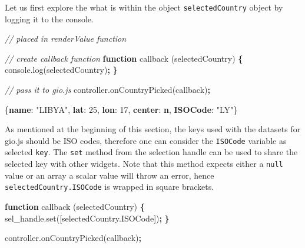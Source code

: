 \documentclass[
]{krantz}
\makeatletter
\newenvironment{Shaded}{\begin{snugshade}}{\end{snugshade}}
\newcommand{\AttributeTok}[1]{\textcolor[rgb]{0.61,0.61,0.61}{#1}}
\newcommand{\CommentTok}[1]{\textcolor[rgb]{0.37,0.37,0.37}{\textit{#1}}}
\newcommand{\DecValTok}[1]{\textcolor[rgb]{0.06,0.06,0.06}{#1}}
\newcommand{\ErrorTok}[1]{\textcolor[rgb]{0.14,0.14,0.14}{\textbf{#1}}}
\newcommand{\FunctionTok}[1]{\textcolor[rgb]{0,0,0}{#1}}
\newcommand{\KeywordTok}[1]{\textcolor[rgb]{0.27,0.27,0.27}{\textbf{#1}}}
\newcommand{\NormalTok}[1]{#1}
\newcommand{\OperatorTok}[1]{\textcolor[rgb]{0.43,0.43,0.43}{\textbf{#1}}}
\newcommand{\StringTok}[1]{\textcolor[rgb]{0.5,0.5,0.5}{#1}}
\newcommand{\VariableTok}[1]{\textcolor[rgb]{0,0,0}{#1}}
\newenvironment{kframe}{%
\medskip{}
\setlength{\fboxsep}{.8em}
 \def\at@end@of@kframe{}%
 \ifinner\ifhmode%
  \def\at@end@of@kframe{\end{minipage}}%
  \begin{minipage}{\columnwidth}%
 \fi\fi%
 \def\FrameCommand##1{\hskip\@totalleftmargin \hskip-\fboxsep
 \colorbox{shadecolor}{##1}\hskip-\fboxsep
     \hskip-\linewidth \hskip-\@totalleftmargin \hskip\columnwidth}%
 \MakeFramed {\advance\hsize-\width
   \@totalleftmargin\z@ \linewidth\hsize
   \@setminipage}}%
 {\par\unskip\endMakeFramed%
 \at@end@of@kframe}
\renewenvironment{Shaded}{\begin{kframe}}{\end{kframe}}
\makeatother
\begin{document}
Let us first explore the what is within the object \texttt{selectedCountry} object by logging it to the console.

\begin{Shaded}
\begin{Highlighting}[]
\CommentTok{// placed in renderValue function}

\CommentTok{// create callback function}
\KeywordTok{function} \AttributeTok{callback}\NormalTok{ (selectedCountry) }\OperatorTok{\{}
  \VariableTok{console}\NormalTok{.}\AttributeTok{log}\NormalTok{(selectedCountry)}\OperatorTok{;}
\OperatorTok{\}}

\CommentTok{// pass it to gio.js}
\VariableTok{controller}\NormalTok{.}\AttributeTok{onCountryPicked}\NormalTok{(callback)}\OperatorTok{;}
\end{Highlighting}
\end{Shaded}

\begin{Shaded}
\begin{Highlighting}[]
\FunctionTok{\{}\ErrorTok{name}\FunctionTok{:} \StringTok{"LIBYA"}\FunctionTok{,} \ErrorTok{lat}\FunctionTok{:} \DecValTok{25}\FunctionTok{,} \ErrorTok{lon}\FunctionTok{:} \DecValTok{17}\FunctionTok{,} \ErrorTok{center}\FunctionTok{:} \ErrorTok{n}\FunctionTok{,} \ErrorTok{ISOCode}\FunctionTok{:} \StringTok{"LY"}\FunctionTok{\}}
\end{Highlighting}
\end{Shaded}

As mentioned at the beginning of this section, the keys used with the datasets for gio.js should be ISO codes, therefore one can consider the \texttt{ISOCode} variable as selected \texttt{key}. The \texttt{set} method from the selection handle can be used to share the selected key with other widgets. Note that this method expects either a \texttt{null} value or an array a scalar value will throw an error, hence \texttt{selectedCountry.ISOCode} is wrapped in square brackets.

\begin{Shaded}
\begin{Highlighting}[]
\KeywordTok{function} \AttributeTok{callback}\NormalTok{ (selectedCountry) }\OperatorTok{\{}
  \VariableTok{sel\_handle}\NormalTok{.}\AttributeTok{set}\NormalTok{([}\VariableTok{selectedCountry}\NormalTok{.}\AttributeTok{ISOCode}\NormalTok{])}\OperatorTok{;}
\OperatorTok{\}}

\VariableTok{controller}\NormalTok{.}\AttributeTok{onCountryPicked}\NormalTok{(callback)}\OperatorTok{;}
\end{Highlighting}
\end{Shaded}
\end{document}
